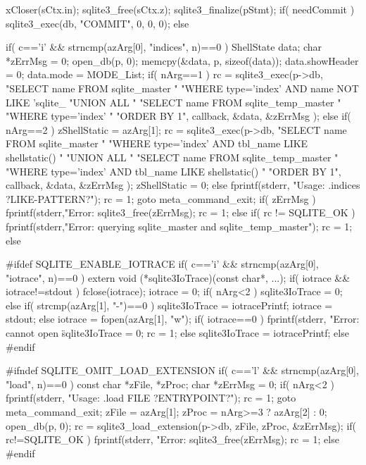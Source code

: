\begin{Codex}[label=shell.c,numbers=left]
{{    xCloser(sCtx.in);
    sqlite3_free(sCtx.z);
    sqlite3_finalize(pStmt);
    if( needCommit ) sqlite3_exec(db, "COMMIT", 0, 0, 0);
  }else

  if( c=='i' && strncmp(azArg[0], "indices", n)==0 ){
    ShellState data;
    char *zErrMsg = 0;
    open_db(p, 0);
    memcpy(&data, p, sizeof(data));
    data.showHeader = 0;
    data.mode = MODE_List;
    if( nArg==1 ){
      rc = sqlite3_exec(p->db,
        "SELECT name FROM sqlite_master "
        "WHERE type='index' AND name NOT LIKE 'sqlite_%
        "UNION ALL "
        "SELECT name FROM sqlite_temp_master "
        "WHERE type='index' "
        "ORDER BY 1",
        callback, &data, &zErrMsg
      );
    }else if( nArg==2 ){
      zShellStatic = azArg[1];
      rc = sqlite3_exec(p->db,
        "SELECT name FROM sqlite_master "
        "WHERE type='index' AND tbl_name LIKE shellstatic() "
        "UNION ALL "
        "SELECT name FROM sqlite_temp_master "
        "WHERE type='index' AND tbl_name LIKE shellstatic() "
        "ORDER BY 1",
        callback, &data, &zErrMsg
      );
      zShellStatic = 0;
    }else{
      fprintf(stderr, "Usage: .indices ?LIKE-PATTERN?\n");
      rc = 1;
      goto meta_command_exit;
    }
    if( zErrMsg ){
      fprintf(stderr,"Error: %
      sqlite3_free(zErrMsg);
      rc = 1;
    }else if( rc != SQLITE_OK ){
      fprintf(stderr,"Error: querying sqlite_master and sqlite_temp_master\n");
      rc = 1;
    }
  }else

#ifdef SQLITE_ENABLE_IOTRACE
  if( c=='i' && strncmp(azArg[0], "iotrace", n)==0 ){
    extern void (*sqlite3IoTrace)(const char*, ...);
    if( iotrace && iotrace!=stdout ) fclose(iotrace);
    iotrace = 0;
    if( nArg<2 ){
      sqlite3IoTrace = 0;
    }else if( strcmp(azArg[1], "-")==0 ){
      sqlite3IoTrace = iotracePrintf;
      iotrace = stdout;
    }else{
      iotrace = fopen(azArg[1], "w");
      if( iotrace==0 ){
        fprintf(stderr, "Error: cannot open \"%
        sqlite3IoTrace = 0;
        rc = 1;
      }else{
        sqlite3IoTrace = iotracePrintf;
      }
    }
  }else
#endif

#ifndef SQLITE_OMIT_LOAD_EXTENSION
  if( c=='l' && strncmp(azArg[0], "load", n)==0 ){
    const char *zFile, *zProc;
    char *zErrMsg = 0;
    if( nArg<2 ){
      fprintf(stderr, "Usage: .load FILE ?ENTRYPOINT?\n");
      rc = 1;
      goto meta_command_exit;
    }
    zFile = azArg[1];
    zProc = nArg>=3 ? azArg[2] : 0;
    open_db(p, 0);
    rc = sqlite3_load_extension(p->db, zFile, zProc, &zErrMsg);
    if( rc!=SQLITE_OK ){
      fprintf(stderr, "Error: %
      sqlite3_free(zErrMsg);
      rc = 1;
    }
  }else
#endif

}
\end{Codex}
